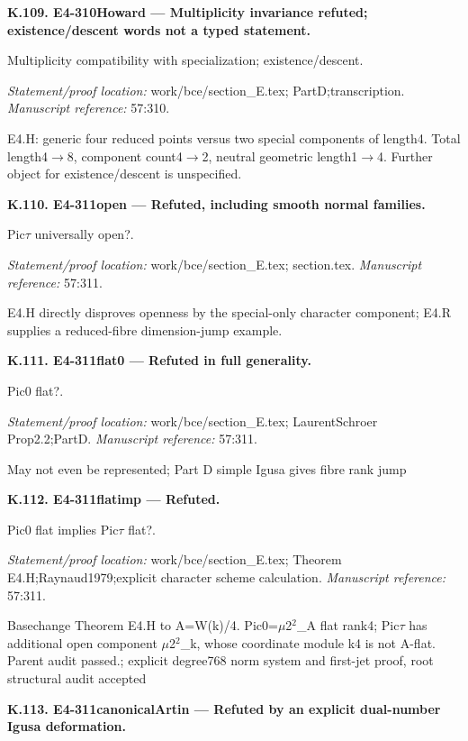 \par\medskip\noindent\textbf{K.109. E4-310Howard --- Multiplicity invariance refuted; existence/descent words not a typed statement.}\par
Multiplicity compatibility with specialization; existence/descent.
\par\emph{Statement/proof location:} work/bce/section\_E.tex; PartD;transcription.
\emph{Manuscript reference:} 57:310.
\par E4.H: generic four reduced points versus two special components of length4. Total length4\ensuremath{\to}8, component count4\ensuremath{\to}2, neutral geometric length1\ensuremath{\to}4. Further object for existence/descent is unspecified.
\par\medskip\noindent\textbf{K.110. E4-311open --- Refuted, including smooth normal families.}\par
Pic\ensuremath{\tau} universally open?.
\par\emph{Statement/proof location:} work/bce/section\_E.tex; section.tex.
\emph{Manuscript reference:} 57:311.
\par E4.H directly disproves openness by the special-only character component; E4.R supplies a reduced-fibre dimension-jump example.
\par\medskip\noindent\textbf{K.111. E4-311flat0 --- Refuted in full generality.}\par
Pic0 flat?.
\par\emph{Statement/proof location:} work/bce/section\_E.tex; LaurentSchroer Prop2.2;PartD.
\emph{Manuscript reference:} 57:311.
\par May not even be represented; Part D simple Igusa gives fibre rank jump
\par\medskip\noindent\textbf{K.112. E4-311flatimp --- Refuted.}\par
Pic0 flat implies Pic\ensuremath{\tau} flat?.
\par\emph{Statement/proof location:} work/bce/section\_E.tex; Theorem E4.H;Raynaud1979;explicit character scheme calculation.
\emph{Manuscript reference:} 57:311.
\par Basechange Theorem E4.H to A=W(k)/4. Pic0=\ensuremath{\mu}2\ensuremath{{}^2}\_A flat rank4; Pic\ensuremath{\tau} has additional open component \ensuremath{\mu}2\ensuremath{{}^2}\_k, whose coordinate module k4 is not A-flat. Parent audit passed.; explicit degree768 norm system and first-jet proof, root structural audit accepted
\par\medskip\noindent\textbf{K.113. E4-311canonicalArtin --- Refuted by an explicit dual-number Igusa deformation.}\par
